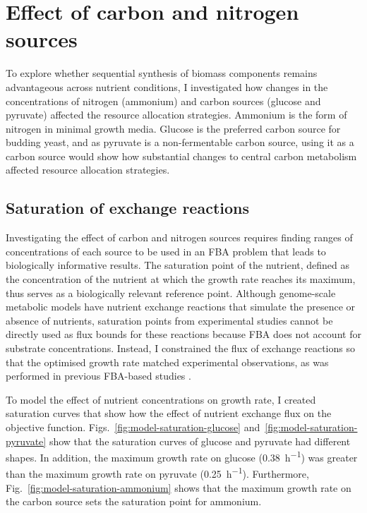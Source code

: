 \section{Effect of carbon and nitrogen sources}
\label{sec:model-exchange}

To explore whether sequential synthesis of biomass components remains advantageous across nutrient conditions, I investigated how changes in the concentrations of nitrogen (ammonium) and carbon sources (glucose and pyruvate) affected the resource allocation strategies.
Ammonium is the form of nitrogen in minimal growth media.
Glucose is the preferred carbon source for budding yeast, and as pyruvate is a non-fermentable carbon source, using it as a carbon source would show how substantial changes to central carbon metabolism affected resource allocation strategies.

\subsection{Saturation of exchange reactions}
\label{subsec:model-saturation}

Investigating the effect of carbon and nitrogen sources requires finding ranges of concentrations of each source to be used in an FBA problem that leads to biologically informative results.
The saturation point of the nutrient, defined as the concentration of the nutrient at which the growth rate reaches its maximum, thus serves as a biologically relevant reference point.
Although genome-scale metabolic models have nutrient exchange reactions that simulate the presence or absence of nutrients, saturation points from experimental studies cannot be directly used as flux bounds for these reactions because FBA does not account for substrate concentrations.
Instead, I constrained the flux of exchange reactions so that the optimised growth rate matched experimental observations, as was performed in previous FBA-based studies \parencite{elsemmanWholecellModelingYeast2022,familiSaccharomycesCerevisiaePhenotypes2003}.

To model the effect of nutrient concentrations on growth rate, I created saturation curves that show how the effect of nutrient exchange flux on the objective function.
Figs.\ \ref{fig:model-saturation-glucose} and~\ref{fig:model-saturation-pyruvate} show that the saturation curves of glucose and pyruvate had different shapes.
In addition, the maximum growth rate on glucose (\SI{0.38}{\hour^{-1}}) was greater than the maximum growth rate on pyruvate (\SI{0.25}{\hour^{-1}}).
Furthermore, Fig.\ \ref{fig:model-saturation-ammonium} shows that the maximum growth rate on the carbon source sets the saturation point for ammonium.

